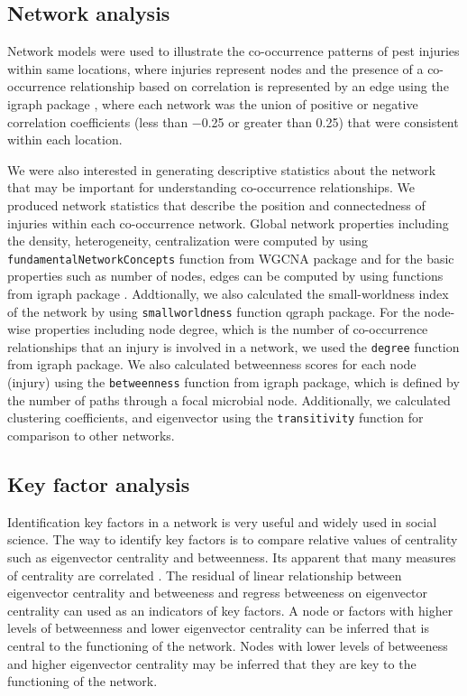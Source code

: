 \documentclass{frontiersSCNS} %
\begin{document}
\begin{methods}
\subsection*{Network analysis}

Network models were used to illustrate the co-occurrence patterns of pest injuries within same locations, where injuries represent nodes and the presence of a co-occurrence relationship based on correlation is represented by an edge using the igraph package \citep{igraph_2006}, where each network was the union of positive or negative correlation coefficients (less than −0.25 or greater than 0.25) that were consistent within each location. 

We were also interested in generating descriptive statistics about the network that may be important for understanding co-occurrence relationships. We produced network statistics that describe the position and connectedness of injuries within each co-occurrence network. Global network properties including the density, heterogeneity, centralization were computed by using \texttt{fundamentalNetworkConcepts} function from  WGCNA package \citep{Langfelder_2008} and for the basic properties such as number of nodes, edges can be computed by using functions from igraph package . Addtionally, we also calculated the small-worldness index of the network by using \texttt{smallworldness} function qgraph package. For the node-wise properties including node degree, which is the number of co-occurrence relationships that an injury is involved in a network, we used the \texttt{degree} function from igraph package. We also calculated betweenness scores for each node (injury) using the \texttt{betweenness} function from igraph package, which is defined by the number of paths through a focal microbial node. Additionally, we calculated clustering coefficients, and eigenvector using the \texttt{transitivity} function for comparison to other networks.

\subsection*{Key factor analysis}

Identification key factors in a network is very useful and widely used in social science. The way to identify key factors is to compare relative values of centrality such as eigenvector centrality and betweenness. Its apparent that many measures of centrality are correlated \citep{Valente_2008}.  The residual of linear relationship between eigenvector centrality and betweeness and regress betweeness on eigenvector centrality can used as an indicators of key factors. A node or factors with higher levels of betweenness and lower eigenvector centrality can be inferred that is central to the functioning of the network. Nodes with lower levels of betweeness and higher eigenvector centrality may be inferred that they are key to the functioning of the network.

\end{methods}
\end{document}
